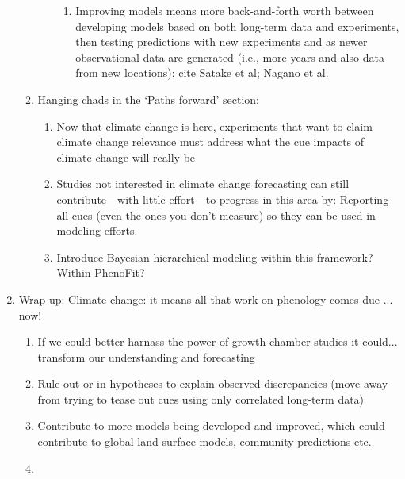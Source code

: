\documentclass[11pt,letterpaper]{article}
\begin{document}
\begin{enumerate}
\begin{enumerate}
\begin{enumerate}
\begin{enumerate}
\item Improving models means more back-and-forth worth between developing models based on both long-term data and experiments, then testing predictions with new experiments and as newer observational data are generated (i.e., more years and also data from new locations); cite Satake et al; Nagano et al.
\end{enumerate}
\end{enumerate}
\item Hanging chads in the `Paths forward' section:
\begin{enumerate}
\item Now that climate change is here, experiments that want to claim climate change relevance must address what the cue impacts of climate change will really be
\item Studies not interested in climate change forecasting can still contribute---with little effort---to progress in this area by: Reporting all cues (even the ones you don't measure) so they can be used in modeling efforts. 
\item Introduce Bayesian hierarchical modeling within this framework? Within PhenoFit?
\end{enumerate}
\end{enumerate}
\item Wrap-up: Climate change: it means all that work on phenology comes due ... now!
\begin{enumerate}
\item If we could better harnass the power of growth chamber studies it could... transform our understanding and forecasting
\item Rule out or in hypotheses to explain observed discrepancies (move away from trying to tease out cues using only correlated long-term data)
\item Contribute to more models being developed and improved, which could contribute to global land surface models, community predictions etc. 
\item {}
\end{enumerate}
\end{enumerate}
\end{document}
